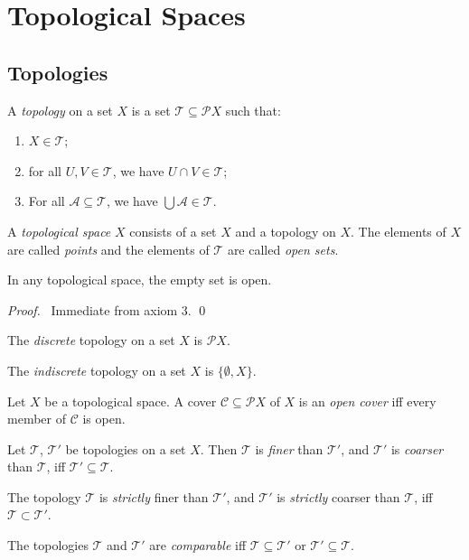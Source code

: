 \chapter{Topological Spaces}

\section{Topologies}

\begin{df}[Topology]
  A \emph{topology} on a set $X$ is a set $\mathcal{T} \subseteq \mathcal{P}
  X$ such that:
  \begin{enumerate}
    \item $X \in \mathcal{T}$;
    \item for all $U, V \in \mathcal{T}$, we have $U \cap V \in \mathcal{T}$;
    \item For all $\mathcal{A} \subseteq \mathcal{T}$, we have $\bigcup
    \mathcal{A} \in \mathcal{T}$.
  \end{enumerate}
  A \emph{topological space} $X$ consists of a set $X$ and a topology on $X$.
  The elements of $X$ are called \emph{points} and the elements of
  $\mathcal{T}$ are called \emph{open sets}.
\end{df}

\begin{prop}
  \label{prop:topology:topological_space:emptyset}
  In any topological space, the empty set is open.
\end{prop}

\begin{proof}
  \pf\ Immediate from axiom 3. \qed
\end{proof}

\begin{df}
  The \emph{discrete} topology on a set $X$ is $\mathcal{P} X$.
\end{df}

\begin{df}
  The \emph{indiscrete} topology on a set $X$ is $\{ \emptyset, X \}$.
\end{df}

\begin{df} %
  Let $X$ be a topological space. A cover $\mathcal{C} \subseteq \mathcal{P}
  X$ of $X$ is an \emph{open cover} iff every member of $\mathcal{C}$ is open.
\end{df}

\begin{df}
  Let $\mathcal{T}$, $\mathcal{T}'$ be topologies on a set $X$. Then
  $\mathcal{T}$ is \emph{finer} than $\mathcal{T}'$, and $\mathcal{T}'$ is
  \emph{coarser} than $\mathcal{T}$, iff $\mathcal{T}' \subseteq \mathcal{T}$.

  The topology $\mathcal{T}$ is \emph{strictly} finer than $\mathcal{T}'$,
  and
  $\mathcal{T}'$ is \emph{strictly} coarser than $\mathcal{T}$, iff
  $\mathcal{T} \subset \mathcal{T}'$.

  The topologies $\mathcal{T}$ and $\mathcal{T}'$ are \emph{comparable} iff
  $\mathcal{T} \subseteq \mathcal{T}'$ or $\mathcal{T}' \subseteq
  \mathcal{T}$.
\end{df}

